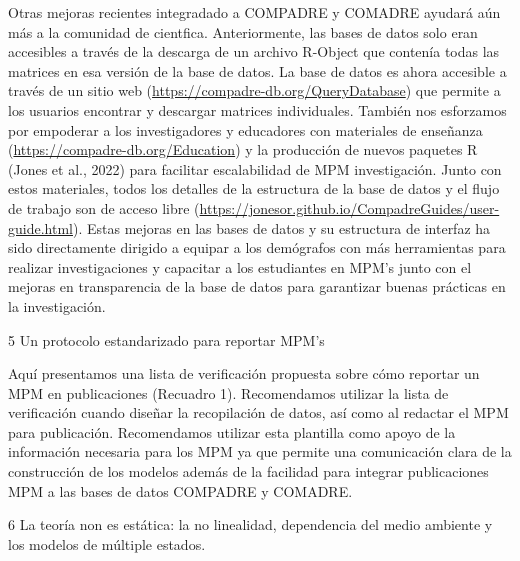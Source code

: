 \documentclass[
]{book}
\theoremstyle{definition}
\theoremstyle{definition}
\theoremstyle{definition}
\theoremstyle{definition}
\theoremstyle{remark}
\begin{document}
Otras mejoras recientes integradado a COMPADRE y COMADRE ayudará aún más a la comunidad de cientfica. Anteriormente, las bases de datos solo eran accesibles a través de la descarga de un archivo R-Object que contenía todas las matrices en esa versión de la base de datos. La base de datos es ahora accesible a través de un sitio web (\url{https://compadre-db.org/QueryDatabase}) que permite a los usuarios encontrar y descargar matrices individuales. También nos esforzamos por empoderar a los investigadores y educadores con materiales de enseñanza (\url{https://compadre-db.org/Education}) y la producción de nuevos paquetes R (Jones et al., 2022) para facilitar escalabilidad de MPM investigación. Junto con estos materiales, todos los detalles de la estructura de la base de datos y el flujo de trabajo son de acceso libre (\url{https://jonesor.github.io/CompadreGuides/user-guide.html}). Estas mejoras en las bases de datos y su estructura de interfaz ha sido directamente dirigido a equipar a los demógrafos con más herramientas para realizar investigaciones y capacitar a los estudiantes en MPM's junto con el mejoras en transparencia de la base de datos para garantizar buenas prácticas en la investigación.

5 \textbar{} Un protocolo estandarizado para reportar MPM's

Aquí presentamos una lista de verificación propuesta sobre cómo reportar un MPM en publicaciones (Recuadro 1). Recomendamos utilizar la lista de verificación cuando diseñar la recopilación de datos, así como al redactar el MPM para publicación. Recomendamos utilizar esta plantilla como apoyo de la información necesaria para los MPM ya que permite una comunicación clara de la construcción de los modelos además de la facilidad para integrar publicaciones MPM a las bases de datos COMPADRE y COMADRE.

6 \textbar{} La teoría non es estática: la no linealidad, dependencia del medio ambiente y los modelos de múltiple estados.
\end{document}
